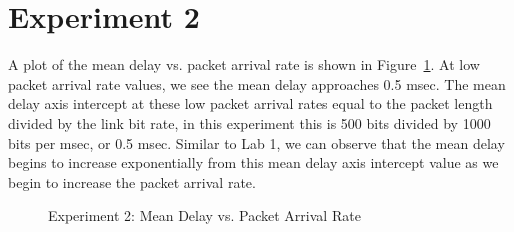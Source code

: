 \section*{Experiment 2}

A plot of the mean delay vs. packet arrival rate is shown in Figure~\ref{fig:exp2}. At low packet arrival rate values, we see the mean delay approaches 0.5 msec. The mean delay axis intercept at these low packet arrival rates equal to the packet length divided by the link bit rate, in this experiment this is 500 bits divided by 1000 bits per msec, or 0.5 msec. Similar to Lab 1, we can observe that the mean delay begins to increase exponentially from this mean delay axis intercept value as we begin to increase the packet arrival rate.


\begin{figure}[htp]
\centering
{}
\caption{Experiment 2: Mean Delay vs. Packet Arrival Rate}
\label{fig:exp2}
\end{figure}